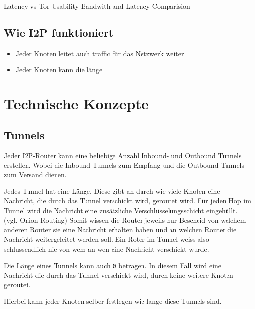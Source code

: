 \cite{hoang_measuring_2019}
\cite{hoang_empirical_2018}

\cite{de_boer_invisible_2019}

\cite{zantout_i2p_2011}

Latency vs Tor Usability Bandwith and Latency Comparision
\cite{ehlert_i2p_2021}

\subsection{Wie I2P funktioniert}

\begin{itemize}
    \item Jeder Knoten leitet auch traffic für das Netzwerk weiter
    \item Jeder Knoten kann die länge 
\end{itemize}

\section{Technische Konzepte}
\label{sec:technischeKonzepte}

\subsection{Tunnels}

Jeder I2P-Router kann eine beliebige Anzahl Inbound- und Outbound Tunnels erstellen.
Wobei die Inbound Tunnels zum Empfang und die Outbound-Tunnels zum Versand dienen.


Jedes Tunnel hat eine Länge.
Diese gibt an durch wie viele Knoten eine Nachricht, die durch das Tunnel verschickt wird, geroutet wird.
Für jeden Hop im Tunnel wird die Nachricht eine zusätzliche Verschlüsselungsschicht eingehüllt. (vgl. Onion Routing)
Somit wissen die Router jeweils nur Bescheid von welchem anderen Router sie eine Nachricht erhalten haben und an welchen Router die Nachricht weitergeleitet werden soll.
Ein Roter im Tunnel weiss also schlussendlich nie von wem an wen eine Nachricht verschickt wurde.

Die Länge eines Tunnels kann auch \lstinline|0| betragen.
In diesem Fall wird eine Nachricht die durch das Tunnel verschickt wird, durch keine weitere Knoten geroutet.

Hierbei kann jeder Knoten selber festlegen wie lange diese Tunnels sind.

